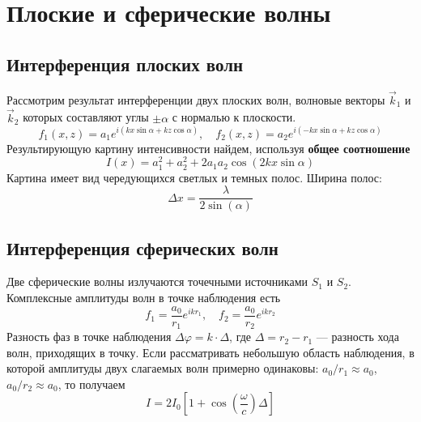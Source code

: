 \documentclass[a4paper, 12pt]{book}
\begin{document}
	\chapter{Плоские и сферические волны}
	\section{Интерференция плоских волн}
	Рассмотрим результат интерференции двух плоских волн, волновые векторы $\vec{k}_1$ и $\vec{k}_2$ которых составляют углы $\pm\alpha$ с нормалью к плоскости.
	\begin{equation*}
		f_1\left(x,z\right)=a_1e^{i\left(kx\sin\alpha+kz\cos\alpha\right)},
		\quad
		f_2\left(x,z\right)=a_2e^{i\left(-kx\sin\alpha+kz\cos\alpha\right)}
	\end{equation*}
	Результирующую картину интенсивности найдем, используя \textbf{общее соотношение}
	\begin{equation}
		I\left(x\right)=a_1^2+a_2^2+2a_1a_2\cos\left(2kx\sin\alpha\right)
	\end{equation}
	Картина имеет вид чередующихся светлых и темных полос. Ширина полос:
	\begin{equation}
		\Delta x=\frac{\lambda}{2\sin\left(\alpha\right)}
	\end{equation}
	\section{Интерференция сферических волн}
	Две сферические волны излучаются точечными источниками $S_1$ и $S_2$. Комплексные амплитуды волн в точке наблюдения есть
	\begin{equation*}
		f_1=\frac{a_0}{r_1}e^{ikr_1},\quad f_2=\frac{a_0}{r_2}e^{ikr_2}
	\end{equation*}
	Разность фаз в точке наблюдения $\Delta\varphi=k\cdot\Delta$, где $\Delta=r_2-r_1$ — разность хода волн, приходящих в точку.
	Если рассматривать небольшую область наблюдения, в которой амплитуды двух слагаемых волн примерно одинаковы: $a_0/r_1\approx a_0$, $a_0/r_2\approx a_0$, то получаем
	\begin{equation}
		I=2I_0\left[1+\cos\left(\frac{\omega}{c}\right)\Delta\right]
	\end{equation}
\end{document}
